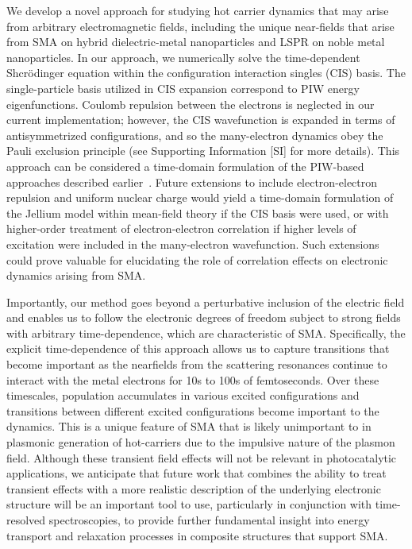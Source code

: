 \documentclass[journal=jpclcd,manuscript=article]{achemso}
\begin{document}
We develop a novel approach for studying hot carrier dynamics that may arise from arbitrary electromagnetic
fields, including the unique near-fields that arise from SMA on hybrid dielectric-metal nanoparticles and LSPR
on noble metal nanoparticles.  In our approach, we numerically solve the time-dependent Shcr\"odinger
equation within the configuration interaction singles (CIS) basis.  The single-particle basis utilized in CIS
expansion correspond to PIW energy eigenfunctions.  Coulomb repulsion between the electrons is neglected in our current 
implementation; however, the CIS wavefunction is expanded in terms of antisymmetrized configurations, and so the
many-electron dynamics obey the Pauli exclusion principle  (see Supporting Information [SI] for more details).  This approach can be considered a time-domain formulation
of the PIW-based approaches described earlier~\cite{GZG_JPCC_2013,ZG_JPCC_2014,MLK_ACSNano_2014,KPB_SciRep_2015}.  Future 
extensions to include electron-electron repulsion and uniform nuclear charge would yield a time-domain formulation
of the Jellium model within mean-field theory if the CIS basis were used, or with higher-order treatment of
electron-electron correlation if higher levels of excitation were included in the many-electron wavefunction.  Such extensions
could prove valuable for elucidating the role of correlation effects on electronic dynamics arising from SMA. 

Importantly, our method goes beyond a perturbative inclusion of the electric field and enables 
us to follow the electronic degrees of freedom subject to strong fields with arbitrary time-dependence, which are characteristic of SMA.   
Specifically, the explicit time-dependence of this approach allows us to capture transitions that become 
important as the nearfields from the scattering resonances continue to interact with the metal electrons 
for 10s to 100s of femtoseconds.  Over these timescales, population accumulates in  
various excited configurations and transitions between different excited configurations become important to the dynamics.  
This is a unique feature of SMA that is likely unimportant to in plasmonic generation of hot-carriers due to the impulsive 
nature of the plasmon field.  Although these transient field effects will not be relevant 
in photocatalytic applications, we anticipate that future work that combines the ability to treat transient effects with 
a more realistic description of the underlying electronic structure will be an important tool to use, particularly in conjunction with
time-resolved spectroscopies, to provide further fundamental insight into energy transport and relaxation processes
in composite structures that support SMA.   
\end{document}
